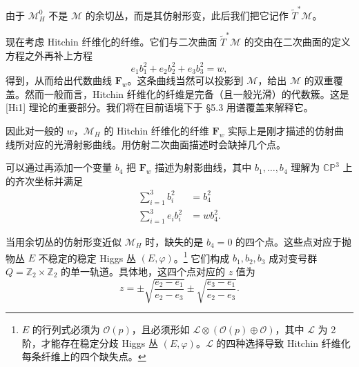 \documentclass[11pt,a4paper]{article}
\begin{document}
由于 $\mathcal{M}_H^0$ 不是 $\mathcal{M}$ 的余切丛，而是其仿射形变，此后我们把它记作 $\tilde{T}^*\mathcal{M}$。

现在考虑 Hitchin 纤维化的纤维。它们与二次曲面 $\tilde{T}^*\mathcal{M}$ 的交由在二次曲面的定义方程之外再补上方程
\begin{equation}\tag{3.43}
e_1b_1^2+e_2b_2^2+e_3b_3^2=w,
\end{equation}
得到，从而给出代数曲线 $\boldsymbol{F}_w$。这条曲线当然可以投影到 $\mathcal{M}$，给出 $\mathcal{M}$ 的双重覆盖。然而一般而言，Hitchin 纤维化的纤维是完备（且一般光滑）的代数簇。这是 [Hi1] 理论的重要部分。我们将在目前语境下于 §5.3 用谱覆盖来解释它。

因此对一般的 $w$，$\mathcal{M}_H$ 的 Hitchin 纤维化的纤维 $\boldsymbol{F}_w$ 实际上是刚才描述的仿射曲线所对应的光滑射影曲线。用仿射二次曲面描述时会缺掉几个点。

可以通过再添加一个变量 $b_4$ 把 $\boldsymbol{F}_w$ 描述为射影曲线，其中 $b_1,\dots,b_4$ 理解为 $\mathbb{C}\mathbb{P}^3$ 上的齐次坐标并满足
\begin{equation}\tag{3.44}
\begin{aligned}
\sum_{i=1}^3b_i^2&=b_4^2\\
\sum_{i=1}^3e_ib_i^2&=wb_4^2.
\end{aligned}
\end{equation}

当用余切丛的仿射形变近似 $\mathcal{M}_H$ 时，缺失的是 $b_4=0$ 的四个点。这些点对应于抛物丛 $E$ 不稳定的稳定 Higgs 丛 $(E,\varphi)$。\footnote{$E$ 的行列式必须为 $\mathcal{O}(p)$，且必须形如 $\mathcal{L}\otimes(\mathcal{O}(p)\oplus\mathcal{O})$，其中 $\mathcal{L}$ 为 2 阶，才能存在稳定分歧 Higgs 丛 $(E,\varphi)$。$\mathcal{L}$ 的四种选择导致 Hitchin 纤维化每条纤维上的四个缺失点。} 它们构成 $b_1,b_2,b_3$ 成对变号群 $Q=\mathbb{Z}_2\times\mathbb{Z}_2$ 的单一轨道。具体地，这四个点对应的 $z$ 值为
\begin{equation}\tag{3.45}
z=\pm\sqrt{\frac{e_2-e_1}{e_2-e_3}}\pm\sqrt{\frac{e_3-e_1}{e_2-e_3}}.
\end{equation}
\end{document}
